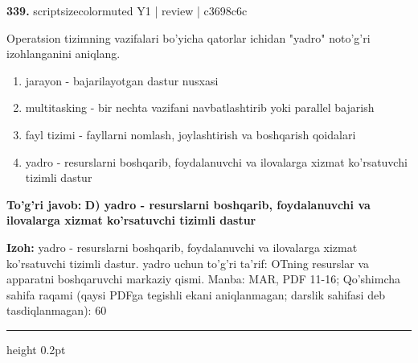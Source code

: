 \documentclass[10pt,a4paper]{article}
\begin{document}
{\bfseries\sffamily\color{ink} 339.} {scriptsizecolor{muted} Y1 | review | c3698c6c}
\par
Operatsion tizimning vazifalari bo'yicha qatorlar ichidan "yadro" noto'g'ri izohlanganini aniqlang.
\begin{enumerate}[label=\Alph*),leftmargin=9mm]
\item jarayon - bajarilayotgan dastur nusxasi
\item multitasking - bir nechta vazifani navbatlashtirib yoki parallel bajarish
\item fayl tizimi - fayllarni nomlash, joylashtirish va boshqarish qoidalari
\item yadro - resurslarni boshqarib, foydalanuvchi va ilovalarga xizmat ko'rsatuvchi tizimli dastur
\end{enumerate}
\begin{tcolorbox}[enhanced,breakable,colback=teal!4,colframe=teal!60!black,boxrule=0.45pt,arc=1.2mm,left=2.7mm,right=2.7mm,top=1.8mm,bottom=1.8mm,before skip=2mm,after skip=2mm]
{\bfseries\sffamily\color{teal}To'g'ri javob:} \textbf{D) yadro - resurslarni boshqarib, foydalanuvchi va ilovalarga xizmat ko'rsatuvchi tizimli dastur}
\par\smallskip
{\bfseries Izoh:} yadro - resurslarni boshqarib, foydalanuvchi va ilovalarga xizmat ko'rsatuvchi tizimli dastur. yadro uchun to'g'ri ta'rif: OTning resurslar va apparatni boshqaruvchi markaziy qismi. Manba: MAR, PDF 11-16; Qo'shimcha sahifa raqami (qaysi PDFga tegishli ekani aniqlanmagan; darslik sahifasi deb tasdiqlanmagan): 60
\end{tcolorbox}
\vspace{2mm}\hrule height 0.2pt\vspace{3mm}
\end{document}
